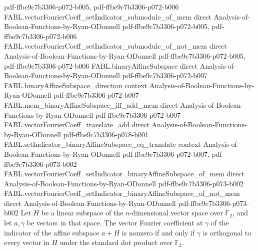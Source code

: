 \begin{theorem}
  {pdf-ffbe9c7b3306-p072-b005,
    pdf-ffbe9c7b3306-p072-b006}
\proofstep
  {FABL.vectorFourierCoeff_setIndicator_submodule_of_mem}
  {direct}
  {Analysis-of-Boolean-Functions-by-Ryan-ODonnell}
  {pdf-ffbe9c7b3306-p072-b005,
    pdf-ffbe9c7b3306-p072-b006}
\proofstep
  {FABL.vectorFourierCoeff_setIndicator_submodule_of_not_mem}
  {direct}
  {Analysis-of-Boolean-Functions-by-Ryan-ODonnell}
  {pdf-ffbe9c7b3306-p072-b005,
    pdf-ffbe9c7b3306-p072-b006}
\proofstep
  {FABL.binaryAffineSubspace}
  {direct}
  {Analysis-of-Boolean-Functions-by-Ryan-ODonnell}
  {pdf-ffbe9c7b3306-p072-b007}
\proofstep
  {FABL.binaryAffineSubspace_direction}
  {context}
  {Analysis-of-Boolean-Functions-by-Ryan-ODonnell}
  {pdf-ffbe9c7b3306-p072-b007}
\proofstep
  {FABL.mem_binaryAffineSubspace_iff_add_mem}
  {direct}
  {Analysis-of-Boolean-Functions-by-Ryan-ODonnell}
  {pdf-ffbe9c7b3306-p072-b007}
\proofstep
  {FABL.vectorFourierCoeff_translate_add}
  {direct}
  {Analysis-of-Boolean-Functions-by-Ryan-ODonnell}
  {pdf-ffbe9c7b3306-p078-b001}
\proofstep
  {FABL.setIndicator_binaryAffineSubspace_eq_translate}
  {context}
  {Analysis-of-Boolean-Functions-by-Ryan-ODonnell}
  {pdf-ffbe9c7b3306-p072-b007,
    pdf-ffbe9c7b3306-p073-b002}
\proofstep
  {FABL.vectorFourierCoeff_setIndicator_binaryAffineSubspace_of_mem}
  {direct}
  {Analysis-of-Boolean-Functions-by-Ryan-ODonnell}
  {pdf-ffbe9c7b3306-p073-b002}
\proofstep
  {FABL.vectorFourierCoeff_setIndicator_binaryAffineSubspace_of_not_mem}
  {direct}
  {Analysis-of-Boolean-Functions-by-Ryan-ODonnell}
  {pdf-ffbe9c7b3306-p073-b002}
Let $H$ be a linear subspace of the $n$-dimensional vector space over $\mathbb{F}_2$,
and let $a,\gamma$ be vectors in that space. The vector Fourier coefficient at $\gamma$
of the indicator of the affine subspace $a+H$ is nonzero if and only if $\gamma$ is
orthogonal to every vector in $H$ under the standard dot product over $\mathbb{F}_2$.
\end{theorem}

